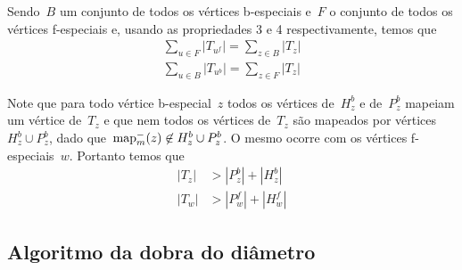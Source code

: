 	Sendo~$B$ um conjunto de todos os vértices b-especiais e~$F$ o
	conjunto de todos os vértices f-especiais e, usando as propriedades 
	3 e 4 respectivamente, temos que
	\begin{align}
		\displaystyle\sum_{u\in F}|T_{u^f}| = 
		\displaystyle\sum_{z\in B}|T_{z}| \nonumber \\
		\displaystyle\sum_{u\in B}|T_{u^b}| = 
		\displaystyle\sum_{z\in F}|T_{z}| \nonumber
	\end{align}

	Note que para todo vértice b-especial~$z$ todos os vértices 
	de~$H^b_z$ e de~$P^b_z$ mapeiam um vértice 
	de~$T_z$ e que nem todos os vértices de~$T_z$ são mapeados por
	vértices~$H^b_z\cup P_z^b$, 
	dado que~$\mathrm{map}^-_m(z)\not\in H^b_z\cup P_z^b$.
	O mesmo ocorre com os vértices f-especiais~$w$.
	Portanto temos que
	\begin{align}
		|T_z| &> |P^b_z| + |H^b_z| \\
		|T_w| &> |P^f_w| + |H^f_w|
	\end{align}


	\subsection{Algoritmo da dobra do diâmetro}
	\begin{algorithm}[H]
	\label{alg:dobraDiametro}

		\caption{}
		\Output{}

	\end{algorithm}	